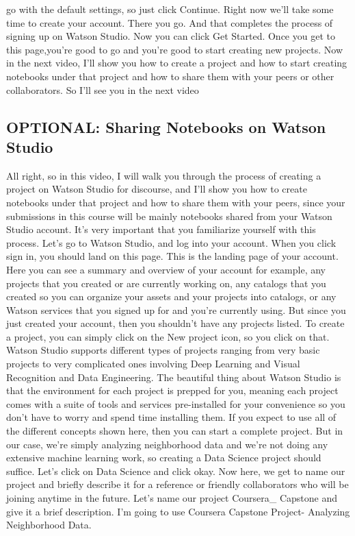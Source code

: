 go with the default settings, so just click Continue. Right now we'll take some time to create your account. There you go. And that completes the process of signing up on Watson Studio. Now you can click Get Started. Once you get to this page,you're good to go and you're good to start creating new projects. Now in the next video, I'll show you how to create a project and how to start creating notebooks under that project and how to share them with your peers or other collaborators. So I'll see you in the next video
	
	\subsection{OPTIONAL: Sharing Notebooks on Watson Studio}
	
	
	All right, so in this video, I will walk you through the process of creating a project on Watson Studio for discourse, and I'll show you how to create notebooks under that project and how to share them with your peers, since your submissions in this course will be mainly notebooks shared from your Watson Studio account. It's very important that you familiarize yourself with this process. Let's go to Watson Studio, and log into your account. When you click sign in, you should land on this page. This is the landing page of your account. Here you can see a summary and overview of your account for example, any projects that you created or are currently working on, any catalogs that you created so you can organize your assets and your projects into catalogs, or any Watson services that you signed up for and you're currently using. But since you just created your account, then you shouldn't have any projects listed. To create a project, you can simply click on the New project icon, so you click on that. Watson Studio supports different types of projects ranging from very basic projects to very complicated ones involving Deep Learning and Visual Recognition and Data Engineering. The beautiful thing about Watson Studio is that the environment for each project is prepped for you, meaning each project comes with a suite of tools and services pre-installed for your convenience so you don't have to worry and spend time installing them. If you expect to use all of the different concepts shown here, then you can start a complete project. But in our case, we're simply analyzing neighborhood data and we're not doing any extensive machine learning work, so creating a Data Science project should suffice. Let's click on Data Science and click okay. Now here, we get to name our project and briefly describe it for a reference or friendly collaborators who will be joining anytime in the future. Let's name our project Coursera_ Capstone and give it a brief description. I'm going to use Coursera Capstone Project- Analyzing Neighborhood Data.
